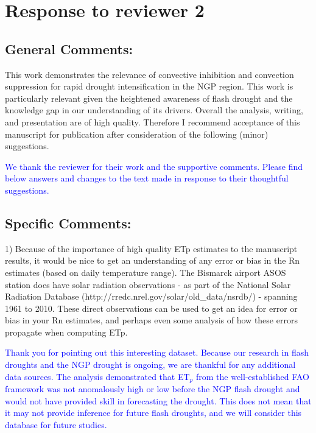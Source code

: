 \documentclass[hess, manuscript]{copernicus}
\def\TG{\textcolor{blue}}
\begin{document}
\section{Response to reviewer 2}

\subsection{General  Comments:}

This  work  demonstrates  the  relevance  of  convective  inhibition and convection suppression for rapid drought intensification in the NGP region.  This work is particularly relevant given the heightened awareness of flash drought and the knowledge gap in our understanding of its drivers.  Overall the analysis, writing, and presentation are of high quality. Therefore I recommend acceptance of this manuscript for publication after consideration of the following (minor) suggestions.

\TG{We thank the reviewer for their work and the supportive comments. Please find below answers and changes to the text made in response to their thoughtful suggestions.}

\subsection{Specific Comments:} 

1) Because of the importance of high quality ETp estimates to the manuscript results, it would be nice to get an understanding of any error or bias in the Rn estimates (based on daily temperature range).  The Bismarck airport ASOS station does have solar radiation observations - as part of the National Solar Radiation Database (http://rredc.nrel.gov/solar/old\_data/nsrdb/) - spanning 1961 to 2010. These direct observations can be used to get an idea for error or bias in your Rn estimates, and perhaps even some analysis of how these errors propagate when computing ETp.

\TG{Thank you for pointing out this interesting dataset. Because our research in flash droughts and the NGP drought is ongoing, we are thankful for any additional data sources. The analysis demonstrated that ET$_p$ from the well-established FAO framework was not anomalously high or low before the NGP flash drought and would not have provided skill in forecasting the drought. This does not mean that it may not provide inference for future flash droughts, and we will consider this database for future studies.}
\end{document}
